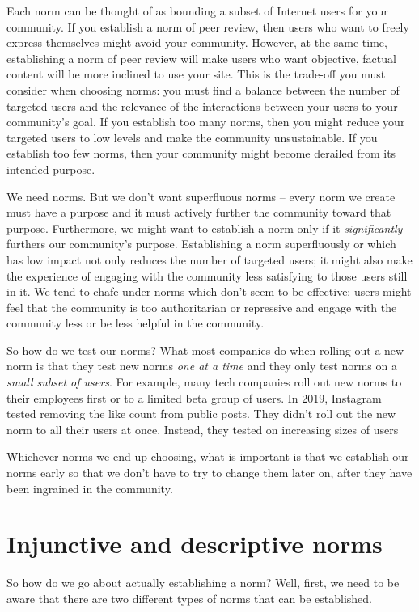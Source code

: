 \documentclass[class=book, crop=false]{standalone}
\begin{document}
Each norm can be thought of as bounding a subset of Internet users for your community. If you establish a norm of peer review, then users who want to freely express themselves might avoid your community. However, at the same time, establishing a norm of peer review will make users who want objective, factual content will be more inclined to use your site. This is the trade-off you must consider when choosing norms: you must find a balance between the number of targeted users and the relevance of the interactions between your users to your community's goal. If you establish too many norms, then you might reduce your targeted users to low levels and make the community unsustainable. If you establish too few norms, then your community might become derailed from its intended purpose.

We need norms. But we don't want superfluous norms -- every norm we create must have a purpose and it must actively further the community toward that purpose. Furthermore, we might want to establish a norm only if it \textit{significantly} furthers our community's purpose. Establishing a norm superfluously or which has low impact not only reduces the number of targeted users; it might also make the experience of engaging with the community less satisfying to those users still in it. We tend to chafe under norms which don't seem to be effective; users might feel that the community is too authoritarian or repressive and engage with the community less or be less helpful in the community.

So how do we test our norms? What most companies do when rolling out a new norm is that they test new norms \textit{one at a time} and they only test norms on a \textit{small subset of users}. For example, many tech companies roll out new norms to their employees first or to a limited beta group of users. In 2019, Instagram tested removing the like count from public posts. They didn't roll out the new norm to all their users at once. Instead, they tested on increasing sizes of users

Whichever norms we end up choosing, what is important is that we establish our norms early so that we don't have to try to change them later on, after they have been ingrained in the community.

\section{Injunctive and descriptive norms}

So how do we go about actually establishing a norm? Well, first, we need to be aware that there are two different types of norms that can be established.
\end{document}
